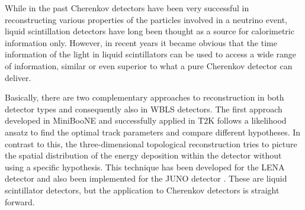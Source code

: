 %
%
%
%
%
%
%


\newpage

\vfill



While in the past Cherenkov detectors have been very successful in reconstructing various properties of the particles involved
in a neutrino event, liquid scintillation detectors have long been thought as a source for calorimetric information only. 
However, in recent years it became obvious that the time information of the light in liquid scintillators can be used to 
access a wide range of information, similar or even superior to what a pure Cherenkov detector can deliver. 

Basically, there are two complementary approaches to reconstruction in both detector types and consequently also in WBLS 
detectors. The first approach developed in MiniBooNE\cite{patt09} and successfully applied in T2K\cite{Abe:2015awa} follows a likelihood ansatz to 
find the optimal track parameters and compare different hypotheses. In contrast to this, the three-dimensional topological 
reconstruction tries to picture the spatial distribution of the energy deposition within the detector without using a 
specific hypothesis. This technique has been developed for the LENA\cite{Wurm:2011zn} detector and also been implemented for the JUNO detector \cite{An:2015jdp}.
These are liquid scintillator detectors, but the application to Cherenkov detectors is straight forward. 

